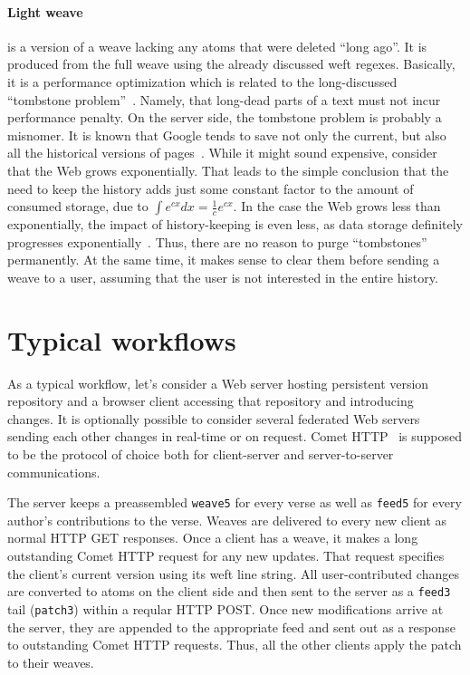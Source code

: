 \documentclass[twocolumn]{article}
\begin{document}
\paragraph{Light weave} is a version of a weave lacking any atoms that were deleted ``long ago''. It is produced from the full weave using the already discussed weft regexes. Basically, it is a performance optimization which is related to the long-discussed ``tombstone problem''~\cite{ot}. Namely, that long-dead parts of a text must not incur performance penalty. On the server side, the tombstone problem is probably a misnomer. It is known that Google tends to save not only the current, but also all the historical versions of pages~\cite{google-history}. While it might sound expensive, consider that the Web grows exponentially. That leads to the simple conclusion that the need to keep the history adds just some constant factor to the amount of consumed storage, due to $\int e^{cx}dx = \frac{1}{c} e^{cx}$. In the case the Web grows less than exponentially, the impact of history-keeping is even less, as data storage definitely progresses exponentially~\cite{hdd}. Thus, there are no reason to purge ``tombstones'' permanently. At the same time, it makes sense to clear them before sending a weave to a user, assuming that the user is not interested in the entire history.

\section {Typical workflows}

As a typical workflow, let's consider a Web server hosting persistent version repository and a browser client accessing that repository and introducing changes. It is optionally possible to consider several federated Web servers sending each other changes in real-time or on request. Comet HTTP~\cite{comet} is supposed to be the protocol of choice both for client-server and server-to-server communications.

The server keeps a preassembled {\tt weave5} for every verse as well as {\tt feed5} for every author's contributions to the verse. Weaves are delivered to every new client as normal HTTP GET responses. Once a client has a weave, it makes a long outstanding Comet HTTP request for any new updates. That request specifies the client's current version using its weft line string. All user-contributed changes are converted to atoms on the client side and then sent to the server as a {\tt feed3} tail ({\tt patch3}) within a reqular HTTP POST. Once new modifications arrive at the server, they are appended to the appropriate feed and sent out as a response to outstanding Comet HTTP requests. Thus, all the other clients apply the patch to their weaves.
\end{document}

